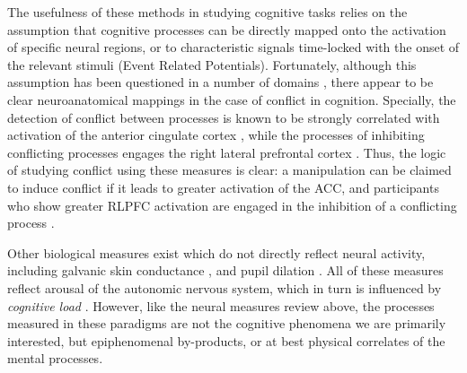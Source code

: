 The usefulness of these methods in studying cognitive tasks
relies on the assumption that cognitive processes can be
directly mapped onto the activation of specific neural regions,
or to characteristic signals time-locked with the onset of the relevant stimuli 
(Event Related Potentials).
Fortunately, although this assumption
has been questioned in a number of domains \citep[see][]{Coltheart2013},
there appear to be clear neuroanatomical mappings
in the case of conflict in cognition.
Specially, the detection of conflict between processes
is known to be strongly correlated with activation of
the anterior cingulate cortex \citep[ACC;][]{Botvinick2004},
while the processes of inhibiting conflicting processes
engages the right lateral prefrontal cortex \citep[RLPFC;][]{Aron2004}.
Thus, the logic of studying conflict using these measures is clear:
a manipulation can be claimed to induce conflict
if it leads to greater activation of the ACC,
and participants who show greater RLPFC activation
are engaged in the inhibition of a conflicting process
\citep[see, i.e.][]{DeNeys2008}.

Other biological measures exist which
do not directly reflect neural activity,
including galvanic skin conductance \citep{DeNeys2010, Figner2010},
and pupil dilation \citep{Fiedler2012, Kahneman1966, Wang2011}.
All of these measures reflect arousal of the autonomic nervous system,
which in turn is influenced by \emph{cognitive load}
\citep{Kahneman1966}.
However, like the neural measures review above,
the processes measured in these paradigms
are not the cognitive phenomena we are primarily interested,
but epiphenomenal by-products,
or at best physical correlates of the mental processes.

